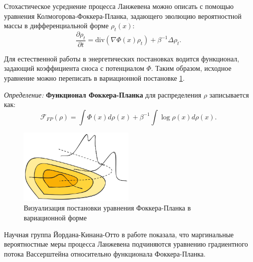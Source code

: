 Стохастическое усреднение процесса Ланжевена можно описать с помощью уравнения Колмогорова-Фоккера-Планка, 
задающего эволюцию вероятностной массы в дифференциальной форме  $\rho_t(x)$:
\begin{equation}
    \frac{\partial \rho_t}{\partial t} = \text{div}(\nabla \Phi(x) \rho_t) + \beta^{-1} \Delta \rho_t.
\end{equation}

Для естественной работы в энергетических постановках водится функционал, задающий коэффициента сноса с потенциалом $\Phi$.
Таким образом, исходное уравнение можно переписать в вариационной постановке \ref{variation_fp}.

\textit{Определение:} \textbf{Функционал Фоккера-Планка} для распределения $\rho$ записывается как: 
\begin{equation}
    \mathcal{F}_{FP}(\rho) = \int  \Phi(x) d\rho(x) + \beta^{-1} \int \log \rho(x) d \rho(x).
\end{equation}
\begin{figure}[h]
    \centering
    \includegraphics[width=0.5\textwidth]{assets/math/transport/functional.excalidraw.png}
    \caption{Визуализация постановки уравнения Фоккера-Планка в вариационной форме}
    \label{variation_fp}
\end{figure}
Научная группа Йордана-Кинана-Отто в работе \cite{jordan1998variational} показала, что маргинальные вероятностные
меры процесса Ланжевена подчиняются уравнению градиентного потока Вассерштейна относительно функционала Фоккера-Планка.

